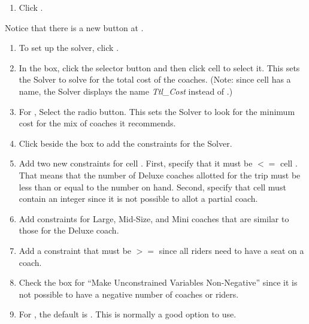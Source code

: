 \begin{enumerate}[resume]	
	\item Click .
\end{enumerate}

Notice that there is a new  button at .

\begin{enumerate}[resume]
	\item To set up the solver, click .
	\item In the  box, click the selector button and then click cell  to select it. This sets the Solver to solve for the total cost of the coaches. (Note: since cell  has a name, the Solver displays the name \textit{Ttl\_Cost} instead of .)
	\item For , Select the  radio button. This sets the Solver to look for the minimum cost for the mix of coaches it recommends.
	\item Click  beside the  box to add the constraints for the Solver.
	\item Add two new constraints for cell . First, specify that it must be $ <= $ cell . That means that the number of Deluxe coaches allotted for the trip must be less than or equal to the number on hand. Second, specify that cell  must contain an integer since it is not possible to allot a partial coach.
	\item Add constraints for Large, Mid-Size, and Mini coaches that are similar to those for the Deluxe coach.
	\item Add a constraint that  must be $ >= $  since all riders need to have a seat on a coach.
	\item Check the box for ``Make Unconstrained Variables Non-Negative'' since it is not possible to have a negative number of coaches or riders.
	 \item For , the default is . This is normally a good option to use.
	 
\end{enumerate}

